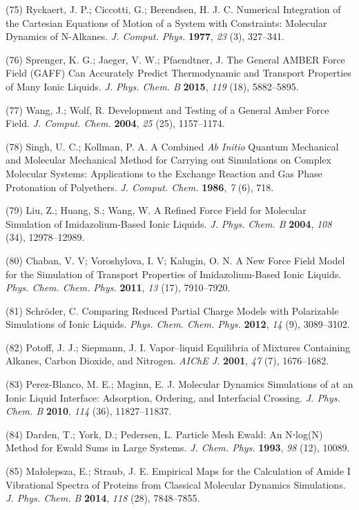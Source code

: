 \documentclass[]{article}
\begin{document}
(75) Ryckaert, J. P.; Ciccotti, G.; Berendsen, H. J. C. Numerical Integration of the Cartesian Equations of Motion of a System with Constraints: Molecular Dynamics of N-Alkanes. \emph{J. Comput. Phys.}  \textbf{1977}, \emph{23} (3), 327--341.

(76) Sprenger, K. G.; Jaeger, V. W.; Pfaendtner, J. The General AMBER Force Field (GAFF) Can Accurately Predict Thermodynamic and Transport Properties of Many Ionic Liquids. \emph{J. Phys. Chem. B} \textbf{2015}, \emph{119} (18), 5882--5895.

(77) Wang, J.; Wolf, R. Development and Testing of a General Amber Force Field. \emph{J. Comput. Chem.} \textbf{2004}, \emph{25} (25), 1157--1174.

(78) Singh, U. C.; Kollman, P. A. A Combined \emph{Ab Initio} Quantum Mechanical and Molecular Mechanical Method for Carrying out Simulations on Complex Molecular Systems: Applications to the  Exchange Reaction and Gas Phase Protonation of Polyethers. \emph{J. Comput. Chem.} \textbf{1986}, \emph{7} (6), 718.

(79) Liu, Z.; Huang, S.; Wang, W. A Refined Force Field for Molecular Simulation of Imidazolium-Based Ionic Liquids. \emph{J. Phys. Chem. B} \textbf{2004}, \emph{108} (34), 12978--12989.

(80) Chaban, V. V; Voroshylova, I. V; Kalugin, O. N. A New Force Field Model for the Simulation of Transport Properties of Imidazolium-Based Ionic Liquids. \emph{Phys. Chem. Chem. Phys.} \textbf{2011}, \emph{13} (17), 7910--7920.

(81) Schröder, C. Comparing Reduced Partial Charge Models with Polarizable Simulations of Ionic Liquids. \emph{Phys. Chem. Chem. Phys.}  \textbf{2012}, \emph{14} (9), 3089--3102.

(82) Potoff, J. J.; Siepmann, J. I. Vapor--liquid Equilibria of Mixtures Containing Alkanes, Carbon Dioxide, and Nitrogen. \emph{AIChE J.}  \textbf{2001}, \emph{47} (7), 1676--1682.

(83) Perez-Blanco, M. E.; Maginn, E. J. Molecular Dynamics Simulations of  at an Ionic Liquid Interface: Adsorption, Ordering, and Interfacial Crossing. \emph{J. Phys. Chem. B} \textbf{2010}, \emph{114} (36), 11827--11837.

(84) Darden, T.; York, D.; Pedersen, L. Particle Mesh Ewald: An N⋅log(N) Method for Ewald Sums in Large Systems. \emph{J. Chem. Phys.}  \textbf{1993}, \emph{98} (12), 10089.

(85) Małolepsza, E.; Straub, J. E. Empirical Maps for the Calculation of Amide I Vibrational Spectra of Proteins from Classical Molecular Dynamics Simulations. \emph{J. Phys. Chem. B} \textbf{2014}, \emph{118} (28), 7848--7855.
\end{document}
